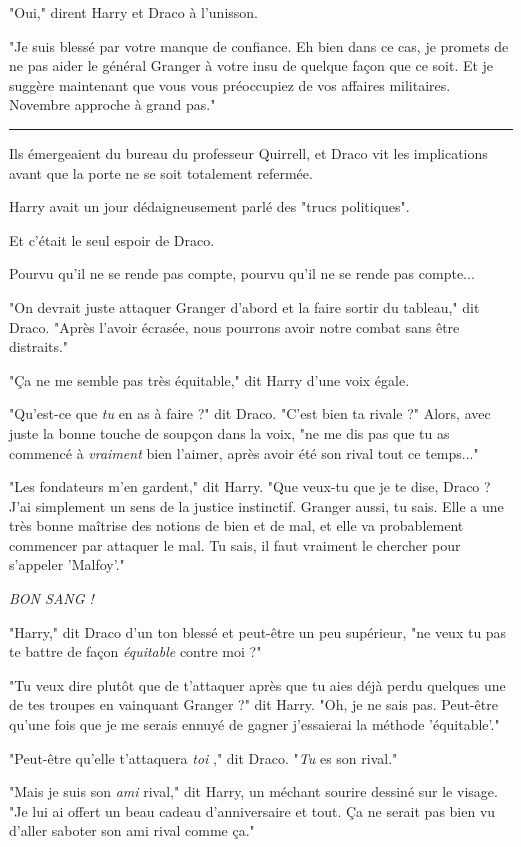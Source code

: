 "Oui," dirent Harry et Draco à l'unisson.

"Je suis blessé par votre manque de confiance. Eh bien dans ce cas, je promets de ne pas aider le général Granger à votre insu de quelque façon que ce soit. Et je suggère maintenant que vous vous préoccupiez de vos affaires militaires. Novembre approche à grand pas."
\par\noindent\rule{\textwidth}{0.4pt}
Ils émergeaient du bureau du professeur Quirrell, et Draco vit les implications avant que la porte ne se soit totalement refermée.

Harry avait un jour dédaigneusement parlé des "trucs politiques".

Et c'était le seul espoir de Draco.

Pourvu qu'il ne se rende pas compte, pourvu qu'il ne se rende pas compte...

"On devrait juste attaquer Granger d'abord et la faire sortir du tableau," dit Draco. "Après l'avoir écrasée, nous pourrons avoir notre combat sans être distraits."

"Ça ne me semble pas très équitable," dit Harry d'une voix égale.

"Qu'est-ce que \emph{tu } en as à faire ?" dit Draco. "C'est bien ta rivale ?" Alors, avec juste la bonne touche de soupçon dans la voix, "ne me dis pas que tu as commencé à \emph{vraiment}  bien l'aimer, après avoir été son rival tout ce temps..."

"Les fondateurs m'en gardent," dit Harry. "Que veux-tu que je te dise, Draco ? J'ai simplement un sens de la justice instinctif. Granger aussi, tu sais. Elle a une très bonne maîtrise des notions de bien et de mal, et elle va probablement commencer par attaquer le mal. Tu sais, il faut vraiment le chercher pour s'appeler 'Malfoy'."

\emph{BON SANG !} 

"Harry," dit Draco d'un ton blessé et peut-être un peu supérieur, "ne veux tu pas te battre de façon \emph{équitable}  contre moi ?"

"Tu veux dire plutôt que de t'attaquer après que tu aies déjà perdu quelques une de tes troupes en vainquant Granger ?" dit Harry. "Oh, je ne sais pas. Peut-être qu'une fois que je me serais ennuyé de gagner j'essaierai la méthode 'équitable'."

"Peut-être qu'elle t'attaquera \emph{toi} ," dit Draco. "\emph{Tu}  es son rival."

"Mais je suis son \emph{ami}  rival," dit Harry, un méchant sourire dessiné sur le visage. "Je lui ai offert un beau cadeau d'anniversaire et tout. Ça ne serait pas bien vu d'aller saboter son ami rival comme ça."


